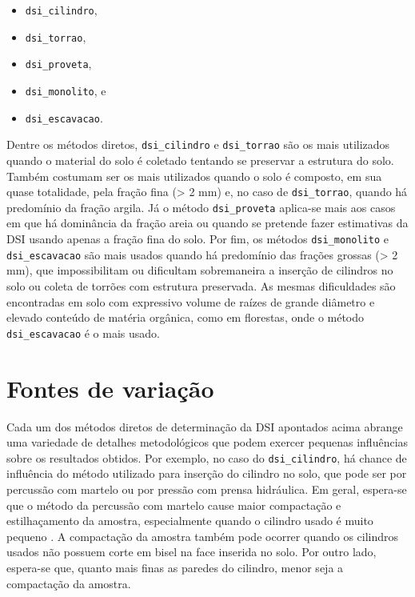 \documentclass[
]{book}
\providecommand{\tightlist}{%
  \setlength{\itemsep}{0pt}\setlength{\parskip}{0pt}}
\begin{document}
\begin{itemize}
\tightlist
\item
  \texttt{dsi\_cilindro},
\item
  \texttt{dsi\_torrao},
\item
  \texttt{dsi\_proveta},
\item
  \texttt{dsi\_monolito}, e
\item
  \texttt{dsi\_escavacao}.
\end{itemize}

Dentre os métodos diretos, \texttt{dsi\_cilindro} e \texttt{dsi\_torrao} são os mais utilizados quando o material do solo é coletado tentando se preservar a estrutura do solo. Também costumam ser os mais utilizados quando o solo é composto, em sua quase totalidade, pela fração fina (\textgreater{} 2 mm) e, no caso de \texttt{dsi\_torrao}, quando há predomínio da fração argila. Já o método \texttt{dsi\_proveta} aplica-se mais aos casos em que há dominância da fração areia ou quando se pretende fazer estimativas da DSI usando apenas a fração fina do solo. Por fim, os métodos \texttt{dsi\_monolito} e \texttt{dsi\_escavacao} são mais usados quando há predomínio das frações grossas (\textgreater{} 2 mm), que impossibilitam ou dificultam sobremaneira a inserção de cilindros no solo ou coleta de torrões com estrutura preservada. As mesmas dificuldades são encontradas em solo com expressivo volume de raízes de grande diâmetro e elevado conteúdo de matéria orgânica, como em florestas, onde o método \texttt{dsi\_escavacao} é o mais usado.

\hypertarget{fontes-de-variauxe7uxe3o-1}{%
\section{Fontes de variação}\label{fontes-de-variauxe7uxe3o-1}}

Cada um dos métodos diretos de determinação da DSI apontados acima abrange uma variedade de detalhes metodológicos que podem exercer pequenas influências sobre os resultados obtidos. Por exemplo, no caso do \texttt{dsi\_cilindro}, há chance de influência do método utilizado para inserção do cilindro no solo, que pode ser por percussão com martelo ou por pressão com prensa hidráulica. Em geral, espera-se que o método da percussão com martelo cause maior compactação e estilhaçamento da amostra, especialmente quando o cilindro usado é muito pequeno \citep{CasanovaEtAl2016}. A compactação da amostra também pode ocorrer quando os cilindros usados não possuem corte em bisel na face inserida no solo. Por outro lado, espera-se que, quanto mais finas as paredes do cilindro, menor seja a compactação da amostra.
\end{document}
